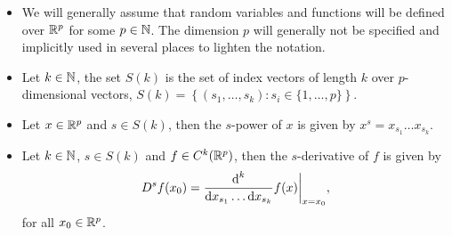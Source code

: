 \begin{itemize}
    \item We will generally assume that random variables and functions will be defined over ${\mathbb{R}^p}$ for some $p \in \mathbb{N}$. The dimension $p$ will generally not be specified and implicitly used in several places to lighten the notation.
    \item Let $k \in \mathbb{N}$, the set $S(k)$ is the set of index vectors of length $k$ over $p$-dimensional vectors, $S(k) = \left\{ (s_1, \ldots, s_k) : s_i \in \{1, \ldots, p\}\right\}$.
    \item Let $x \in {\mathbb{R}^p}$ and $s \in S(k)$, then the $s$-power of $x$ is given by $x^s = x_{s_1} \ldots x_{s_k}$.
    \item {
        Let $k \in \mathbb{N}$, $s \in S(k)$ and $f \in C^k({\mathbb{R}^p})$, then the $s$-derivative of $f$ is given by
        \begin{equation*}
            D^s f(x_0) = \frac{\text{d}^k}{\text{d} x_{s_1} \ldots \text{d} x_{s_k}} f(x) \bigg|_{x=x_0},
        \end{equation*}
        for all $x_0 \in {\mathbb{R}^p}$.
    }
\end{itemize}